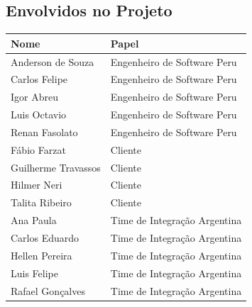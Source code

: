 \documentclass[a4paper, 12pt]{article}
\begin{document}
\subsection{Envolvidos no Projeto}
\begin{table}[ht]
	\centering

	\begin{tabular}{p{7cm}p{7cm}}
		\hline
		\cellcolor{gray}Nome&\cellcolor{gray}Papel  \\
		\hline
		Anderson de Souza&Engenheiro de Software Peru\\
		Carlos Felipe&Engenheiro de Software Peru\\
		Igor Abreu&Engenheiro de Software Peru\\
		Luis Octavio&Engenheiro de Software Peru\\
		Renan Fasolato&Engenheiro de Software Peru\\
		Fábio Farzat&Cliente\\
		Guilherme Travassos&Cliente\\
		Hilmer Neri&Cliente\\
		Talita Ribeiro&Cliente\\
		Ana Paula&Time de Integração Argentina\\
		Carlos Eduardo&Time de Integração Argentina\\
		Hellen Pereira&Time de Integração Argentina\\
		Luis Felipe&Time de Integração Argentina\\
		Rafael Gonçalves&Time de Integração Argentina\\
		\hline
	\end{tabular}
\end{table}
\end{document}
